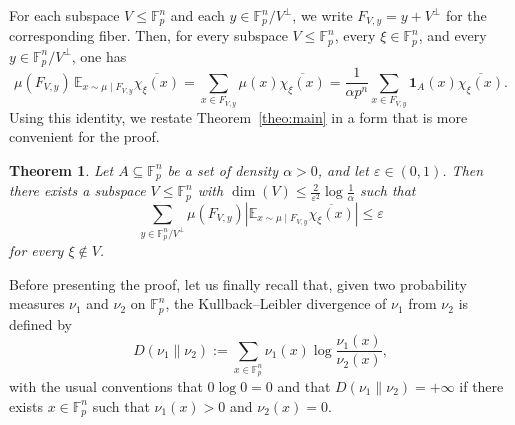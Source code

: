 \documentclass[11pt,reqno]{amsart}
\theoremstyle{plain}
\newtheorem{thm}{Theorem}[section]
\theoremstyle{remark}
\begin{document}
For each subspace $V\leq \mathbb{F}_p^n$ and each $y\in \mathbb{F}_p^n/V^\perp$, we write $F_{V,y}=y+V^\perp$ for the corresponding fiber. Then, for every subspace $V\leq \mathbb{F}_p^n$, every $\xi\in\mathbb{F}_p^n$, and every $y\in \mathbb{F}_p^n/V^\perp$, one has
$$
\mu(F_{V,y})\,\mathbb E_{x\sim\mu\mid F_{V,y}} \overline{\chi_\xi(x)}
=
\sum_{x\in F_{V,y}}\mu(x)\overline{\chi_\xi(x)}
=
\frac{1}{\alpha p^n}\sum_{x\in F_{V,y}}\mathbf{1}_A(x)\overline{\chi_\xi(x)}.
$$
Using this identity, we restate Theorem~\ref{theo:main} in a form that is more convenient for the proof.

\begin{thm}\label{theo:main-restated}
Let $A\subseteq \mathbb{F}_p^n$ be a set of density $\alpha>0$, and let $\varepsilon\in(0,1)$. Then there exists a subspace $V\leq \mathbb{F}_p^n$ with
$
\dim(V)\leq \frac{2}{\varepsilon^2}\log\frac{1}{\alpha}
$
such that
\begin{equation}\label{eq:main-restated}
\sum_{y\in \mathbb F_p^n/V^\perp}
\mu(F_{V,y})
\left|
\mathbb E_{x\sim\mu\mid F_{V,y}} \overline{\chi_\xi(x)}
\right|
\leq \varepsilon
\end{equation}
for every $\xi\notin V$.
\end{thm}
Before presenting the proof, let us finally recall that, given two probability measures $\nu_1$ and $\nu_2$ on $\mathbb{F}_p^n$, the Kullback--Leibler divergence of $\nu_1$ from $\nu_2$ is defined by
$$
D(\nu_1\|\nu_2):=
\sum_{x\in \mathbb{F}_p^n} \nu_1(x)\log\frac{\nu_1(x)}{\nu_2(x)},
$$
with the usual conventions that $0\log 0=0$ and that $D(\nu_1\|\nu_2)=+\infty$ if there exists $x\in \mathbb{F}_p^n$ such that $\nu_1(x)>0$ and $\nu_2(x)=0$.
\end{document}
